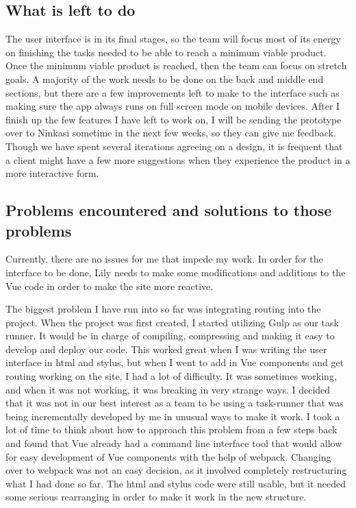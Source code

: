 \documentclass[draftclsnofoot,onecolumn,letterpaper,10pt,compsoc]{IEEEtran}
\begin{document}
\subsection{What is left to do}


The user interface is in its final stages, so the team will focus most of its energy on finishing the tasks needed to be able to reach a minimum viable product.
Once the minimum viable product is reached, then the team can focus on stretch goals.
A majority of the work needs to be done on the back and middle end sections, but there are a few improvements left to make to the interface such as making sure the app always runs on full screen mode on mobile devices.
After I finish up the few features I have left to work on, I will be sending the prototype over to Ninkasi sometime in the next few weeks, so they can give me feedback.
Though we have spent several iterations agreeing on a design, it is frequent that a client might have a few more suggestions when they experience the product in a more interactive form.


\subsection{Problems encountered and solutions to those problems}

Currently, there are no issues for me that impede my work.
In order for the interface to be done, Lily needs to make some modifications and additions to the Vue code in order to make the site more reactive.


The biggest problem I have run into so far was integrating routing into the project.
When the project was first created, I started utilizing Gulp as our task runner.
It would be in charge of compiling, compressing and making it easy to develop and deploy our code.
This worked great when I was writing the user interface in html and stylus, but when I went to add in Vue components and get routing working on the site, I had a lot of difficulty.
It was sometimes working, and when it was not working, it was breaking in very strange ways.
I decided that it was not in our best interest as a team to be using a task-runner that was being incrementally developed by me in unusual ways to make it work.
I took a lot of time to think about how to approach this problem from a few steps back and found that Vue already had a command line interface tool that would allow for easy development of Vue components with the help of webpack.
Changing over to webpack was not an easy decision, as it involved completely restructuring what I had done so far.
The html and stylus code were still usable, but it needed some serious rearranging in order to make it work in the new structure.
\end{document}
